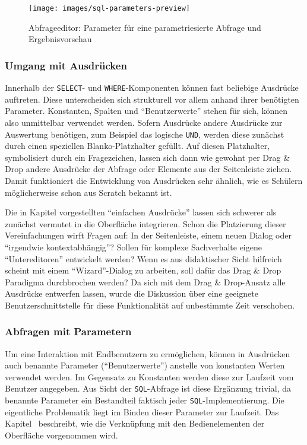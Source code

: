 \begin{figure}[p]
  \texttt{[image: images/sql-parameters-preview]}
  \caption{Abfrageeditor: Parameter für eine parametriesierte Abfrage und Ergebnisvorschau}
  \label{fig:screen-sql-editor-parameters-preview}
\end{figure}

\subsubsection{Umgang mit Ausdrücken}

Innerhalb der \texttt{SELECT}- und \texttt{WHERE}-Komponenten können fast beliebige Ausdrücke auftreten. Diese unterscheiden sich strukturell vor allem anhand ihrer benötigten Parameter. Konstanten, Spalten und "`Benutzerwerte"' stehen für sich, können also unmittelbar verwendet werden. Sofern Ausdrücke andere Ausdrücke zur Auswertung benötigen, zum Beispiel das logische \texttt{UND}, werden diese zunächst durch einen speziellen Blanko-Platzhalter gefüllt. Auf diesen Platzhalter, symbolisiert durch ein Fragezeichen, lassen sich dann wie gewohnt per Drag \& Drop andere Ausdrücke der Abfrage oder Elemente aus der Seitenleiste ziehen. Damit funktioniert die Entwicklung von Ausdrücken sehr ähnlich, wie es Schülern möglicherweise schon aus Scratch bekannt ist.

Die in Kapitel  vorgestellten "`einfachen Ausdrücke"' lassen sich schwerer als zunächst vermutet in die Oberfläche integrieren. Schon die Platzierung dieser Vereinfachungen wirft Fragen auf: In der Seitenleiste, einem neuen Dialog oder "`irgendwie kontextabhängig"'? Sollen für komplexe Sachverhalte eigene "`Untereditoren"' entwickelt werden? Wenn es aus didaktischer Sicht hilfreich scheint mit einem "`Wizard"'-Dialog zu arbeiten, soll dafür das Drag \& Drop Paradigma durchbrochen werden? Da sich mit dem Drag \& Drop-Ansatz alle Ausdrücke entwerfen lassen, wurde die Diskussion über eine geeignete Benutzerschnittstelle für diese Funktionalität auf unbestimmte Zeit verschoben.

\subsubsection{Abfragen mit Parametern}
\label{sec:design-query-params}

Um eine Interaktion mit Endbenutzern zu ermöglichen, können in Ausdrücken auch benannte Parameter ("`Benutzerwerte"') anstelle von konstanten Werten verwendet werden. Im Gegensatz zu Konstanten werden diese zur Laufzeit vom Benutzer angegeben. Aus Sicht der \texttt{SQL}-Abfrage ist diese Ergänzung trivial, da benannte Parameter ein Bestandteil faktisch jeder \texttt{SQL}-Implementierung. Die eigentliche Problematik liegt im Binden dieser Parameter zur Laufzeit. Das Kapitel~ beschreibt, wie die Verknüpfung mit den Bedienelementen der Oberfläche vorgenommen wird.

